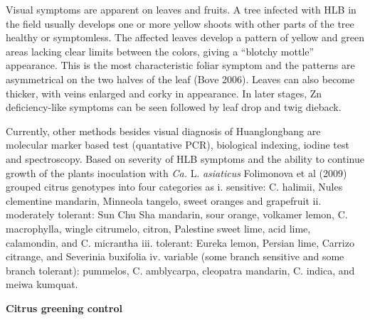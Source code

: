 \documentclass[
  openany]{book}
\begin{document}
Visual symptoms are apparent on leaves and fruits. A tree infected with HLB in the field usually develops one or more yellow shoots with other parts of the tree healthy or symptomless. The affected leaves develop a pattern of yellow and green areas lacking clear limits between the colors, giving a ``blotchy mottle'' appearance. This is the most characteristic foliar symptom and the patterns are asymmetrical on the two halves of the leaf (Bove 2006). Leaves can also become thicker, with veins enlarged and corky in appearance. In later stages, Zn deficiency-like symptoms can be seen followed by leaf drop and twig dieback.

Currently, other methods besides visual diagnosis of Huanglongbang are molecular marker based test (quantative PCR), biological indexing, iodine test and spectroscopy. Based on severity of HLB symptoms and the ability to continue growth of the plants inoculation with \emph{Ca.} L. \emph{asiaticus} Folimonova et al (2009) grouped citrus genotypes into four categories as
i. sensitive: C. halimii, Nules clementine mandarin, Minneola tangelo, sweet oranges and grapefruit
ii. moderately tolerant: Sun Chu Sha mandarin, sour orange, volkamer lemon, C. macrophylla, wingle citrumelo, citron, Palestine sweet lime, acid lime, calamondin, and C. micrantha
iii. tolerant: Eureka lemon, Persian lime, Carrizo citrange, and Severinia buxifolia
iv. variable (some branch sensitive and some branch tolerant): pummelos, C. amblycarpa, cleopatra mandarin, C. indica, and meiwa kumquat.

\textbf{Citrus greening control}
\end{document}
